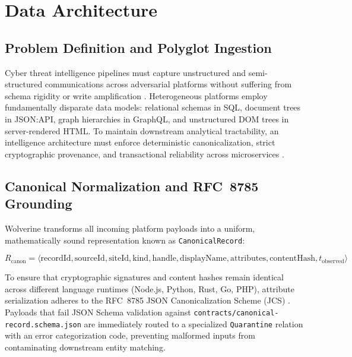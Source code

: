 \chapter{Data Architecture}
\label{ch:data_architecture}

\section{Problem Definition and Polyglot Ingestion}
\label{sec:data_problem}

Cyber threat intelligence pipelines must capture unstructured and semi-structured communications across adversarial platforms without suffering from schema rigidity or write amplification \cite{db:stonebraker2005}. Heterogeneous platforms employ fundamentally disparate data models: relational schemas in SQL, document trees in JSON:API, graph hierarchies in GraphQL, and unstructured DOM trees in server-rendered HTML. To maintain downstream analytical tractability, an intelligence architecture must enforce deterministic canonicalization, strict cryptographic provenance, and transactional reliability across microservices \cite{kleppmann2017designing}.

\section{Canonical Normalization and RFC~8785 Grounding}
\label{sec:canonicalization}

Wolverine transforms all incoming platform payloads into a uniform, mathematically sound representation known as \texttt{CanonicalRecord}:

\begin{equation}
\label{eq:canonical_record}
R_{\text{canon}} = \big\langle \text{recordId}, \text{sourceId}, \text{siteId}, \text{kind}, \text{handle}, \text{displayName}, \text{attributes}, \text{contentHash}, t_{\text{observed}} \big\rangle
\end{equation}

To ensure that cryptographic signatures and content hashes remain identical across different language runtimes (Node.js, Python, Rust, Go, PHP), attribute serialization adheres to the RFC~8785 JSON Canonicalization Scheme (JCS) \cite{rfc8785}. Payloads that fail JSON Schema validation against \texttt{contracts/canonical-record.schema.json} are immediately routed to a specialized \texttt{Quarantine} relation with an error categorization code, preventing malformed inputs from contaminating downstream entity matching.

